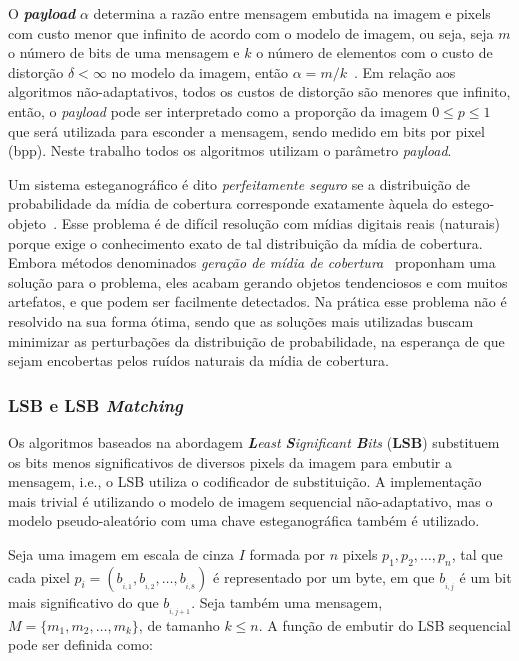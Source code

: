 O \textbf{\textit{payload}} $\alpha$ determina a razão entre mensagem embutida na imagem e pixels com custo menor que infinito de acordo com o modelo de imagem, ou seja, seja $m$ o número de bits de uma mensagem e $k$ o número de elementos com o custo de distorção $\delta < \infty$ no modelo da imagem, então $\alpha = m/k$~\cite{trelliscode}. Em relação aos algoritmos não-adaptativos, todos os custos de distorção são menores que infinito, então, o \textit{payload} pode ser interpretado como a proporção da imagem $0 \le p \le 1$ que será utilizada para esconder a mensagem, sendo medido em bits por pixel (bpp). Neste trabalho todos os algoritmos utilizam o parâmetro \textit{payload}.

Um sistema esteganográfico é dito \textit{perfeitamente seguro} se a distribuição de probabilidade da mídia de cobertura corresponde exatamente àquela do estego-objeto~\cite{cachin2004information}. Esse problema é de difícil resolução com mídias digitais reais (naturais) porque exige o conhecimento exato de tal distribuição da mídia de cobertura. Embora métodos denominados \textit{geração de mídia de cobertura}~\cite{anderson1996,adams2008,ryabko2009} proponham uma solução para o problema, eles acabam gerando objetos tendenciosos e com muitos artefatos, e que podem ser facilmente detectados. Na prática esse problema não é resolvido na sua forma ótima, sendo que as soluções mais utilizadas  buscam minimizar as perturbações da distribuição de probabilidade, na esperança de que sejam encobertas pelos ruídos naturais da mídia de cobertura.

\subsubsection{LSB e LSB \textit{Matching}}
\label{subsec:lsb}

Os algoritmos baseados na abordagem \textit{\textbf{L}east \textbf{S}ignificant \textbf{B}its} (\textbf{LSB}) substituem os bits menos significativos de diversos pixels da imagem para embutir a mensagem, i.e., o LSB utiliza o codificador de substituição. A implementação mais trivial é utilizando o modelo de imagem sequencial não-adaptativo, mas o modelo pseudo-aleatório com uma chave esteganográfica também é utilizado.

Seja uma imagem em escala de cinza $I$ formada por $n$ pixels $p_1, p_2, \dots, p_n$, tal que cada pixel $p_i = (b_{_{i,1}}, b_{_{i,2}}, \dots, b_{_{i,8}})$ é representado por um byte, em que $b_{_{i,j}}$ é um bit mais significativo do que $b_{_{i, j+1}}$. Seja também uma mensagem, $M = \{m_1, m_2, \dots, m_k\}$, de tamanho $k \leq n$. A função de embutir do LSB sequencial pode ser definida como:

